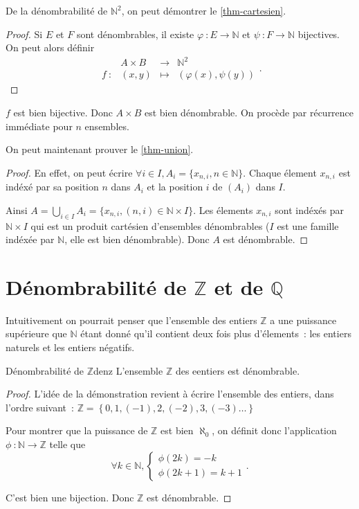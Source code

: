 \documentclass[a4paper,french]{memoir}
\begin{document}
De la dénombrabilité de $\mathbb{N}^2$, on peut démontrer le \cref{thm-cartesien}. 

\begin{proof}
	Si $E$ et $F$ sont dénombrables, il existe $\varphi~: E \to \mathbb{N}$ et $\psi~: F \to \mathbb{N}$ bijectives. On peut alors définir \[ \begin{array}{cccc}
	\ & A \times B & \to & \mathbb{N}^2 \\
	f~: & (x,y) & \mapsto & (\varphi(x), \psi(y))
	\end{array}.\]
	
\end{proof}

$f $ est bien bijective. Donc $A \times B$ est bien dénombrable. On procède par récurrence immédiate pour $n$ ensembles. 

On peut maintenant prouver le \cref{thm-union}. 


\begin{proof}
	En effet, on peut écrire $\forall i \in I, A_i = \{x_{n,i}, n \in \mathbb{N}\}$. Chaque élement $x_{n, i}$ est indéxé par sa position $n$ dans $A_i$ et la position $i$ de $(A_i)$ dans $I$. 
	
	Ainsi $A = \bigcup_{i \in I} A_i = \{x_{n, i}, (n,i) \in \mathbb{N} \times I\}$. Les élements $x_{n,i}$ sont indéxés par $\mathbb{N} \times I$ qui est un produit cartésien d'ensembles dénombrables ($I$ est une famille indéxée par $\mathbb{N}$, elle est bien dénombrable). Donc $A$ est dénombrable.
\end{proof}


\section{\texorpdfstring{Dénombrabilité de $\mathbb{Z}$ et de $\mathbb{Q}$}{}}

Intuitivement on pourrait penser que l'ensemble des entiers $\mathbb{Z}$ a une puissance supérieure que $\mathbb{N}$ étant donné qu'il contient deux fois plus d'élements~: les entiers naturels et les entiers négatifs. 

\begin{theoremb}{Dénombrabilité de $\mathbb{Z}$}{denz}
	L'ensemble $\mathbb{Z}$ des eentiers est dénombrable. 
\end{theoremb}

\begin{proof}
L'idée de la démonstration revient à écrire l'ensemble des entiers, dans l'ordre suivant~:  $\mathbb{Z}=\left\lbrace 0,1,(-1),2,(-2),3,(-3) \dots\right\rbrace$ 

	Pour montrer que la puissance de $\mathbb{Z}$ est bien $\aleph_0$, on définit donc l'application $\phi~: \mathbb{N} \to \mathbb{Z}$ telle que \[ \forall k \in \mathbb{N}, \left\lbrace \begin{array}{c}
	\phi(2k) = -k \\
	\phi(2k + 1) = k+1
	\end{array} \right. .\]
	
	C'est bien une bijection. Donc $\mathbb{Z}$ est dénombrable. 
\end{proof}
\end{document}

